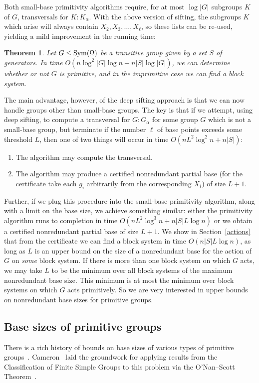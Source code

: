 \documentclass[12pt]{article}
\newcommand{\Sym}{{\rm Sym}}
\newtheorem{theorem}{Theorem}[section]
\begin{document}
Both small-base primitivity
algorithms require, for at most $\log |G|$ subgroups $K$ of $G$,
transversals for $K:K_\alpha$.  With the above version of sifting,
the subgroups $K$ which arise will always contain $X_2,X_3,\ldots,X_\ell$,
so these lists can be re-used, yielding a mild improvement in the running time:
\begin{theorem}\label{mild}
  Let $G\leq\Sym(\Omega)$ be a
  transitive group given by
  a set $S$ of generators. In
  time $O(n\log^2|G|\log n+n|S|\log |G|)$,
  we can determine whether or not $G$ is
  primitive, and in the imprimitive case
  we can find a block system.
\end{theorem}
The main advantage, however, of the deep sifting approach is that
we can now handle groups other than small-base groups.
The key is that if we attempt, using deep sifting, to compute a transversal
for $G:G_\alpha$ for some group $G$ which is not
a small-base group, but terminate if the number  $\ell$ of base points
exceeds some threshold $L$, then one of two things will occur
in time $O(nL^2\log^2 n +n|S|)$:
\begin{enumerate}
\item The algorithm may compute the transversal.

\item The algorithm may produce a certified nonredundant partial
  base (for the certificate take each
  $g_i$ arbitrarily from the corresponding $X_i$)
  of size $L+1$.
\end{enumerate}
Further, if we plug this procedure into the small-base primitivity
algorithm, along with a limit on the base size, we achieve
something similar: either the primitivity
algorithm runs to completion in time $O(nL^2\log^3 n+n|S|L\log n)$
or we obtain a certified nonredundant partial base of size $L+1$.
We show in Section~\ref{actions} that from the certificate
we can find a block system in time $O(n|S|L\log n)$, 
as long as $L$ is an upper bound on the size of a nonredundant
base for the action of $G$ on {\em some}\/ block system.  If there is
more than one block system on which $G$ acts, we may take
$L$ to be the minimum over all block systems of the maximum
nonredundant base size.  This minimum is 
at most the minimum over 
block systems on which $G$ acts primitively.
So we are very interested in upper bounds on nonredundant
base sizes for primitive groups.

\subsection{Base sizes of primitive groups}
There is a rich history of bounds on base sizes of
various types of primitive
groups~\cite{bochert1892ueber,wielandt1969permutation,%
PraegerSaxl1980,Babai1981Uni,babai1982order,MR679977,Pyber1993361}.
Cameron~\cite{Cameron1981} laid the groundwork for applying results from the
Classification of Finite Simple Groups to this problem
via the O'Nan--Scott Theorem~\cite{scott1980representations,Liebeck_Praeger_Saxl_1988}.
\end{document}
